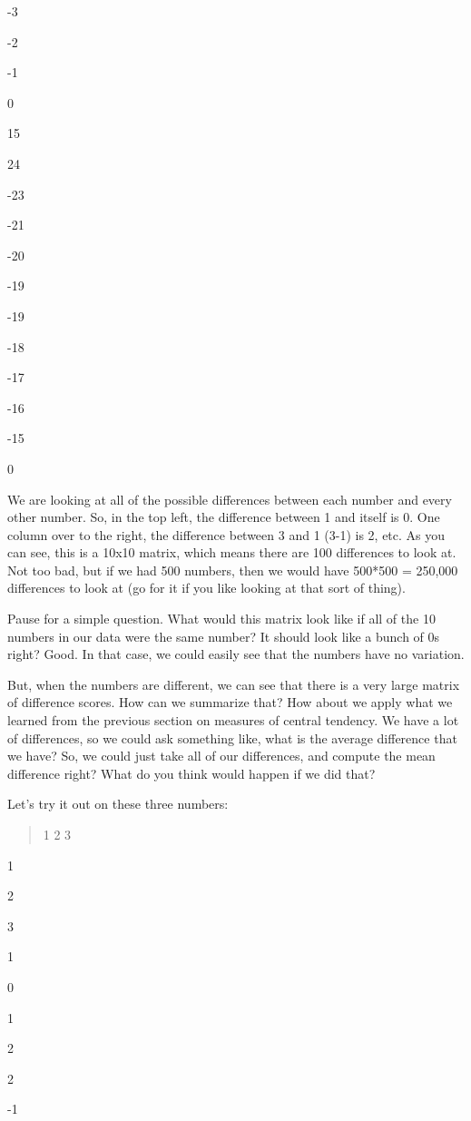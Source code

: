 \documentclass[]{book}
\begin{document}
-3

-2

-1

0

15

24

-23

-21

-20

-19

-19

-18

-17

-16

-15

0

We are looking at all of the possible differences between each number and every other number. So, in the top left, the difference between 1 and itself is 0. One column over to the right, the difference between 3 and 1 (3-1) is 2, etc. As you can see, this is a 10x10 matrix, which means there are 100 differences to look at. Not too bad, but if we had 500 numbers, then we would have 500*500 = 250,000 differences to look at (go for it if you like looking at that sort of thing).

Pause for a simple question. What would this matrix look like if all of the 10 numbers in our data were the same number? It should look like a bunch of 0s right? Good. In that case, we could easily see that the numbers have no variation.

But, when the numbers are different, we can see that there is a very large matrix of difference scores. How can we summarize that? How about we apply what we learned from the previous section on measures of central tendency. We have a lot of differences, so we could ask something like, what is the average difference that we have? So, we could just take all of our differences, and compute the mean difference right? What do you think would happen if we did that?

Let's try it out on these three numbers:

\begin{quote}
1 2 3
\end{quote}

1

2

3

1

0

1

2

2

-1
\end{document}
